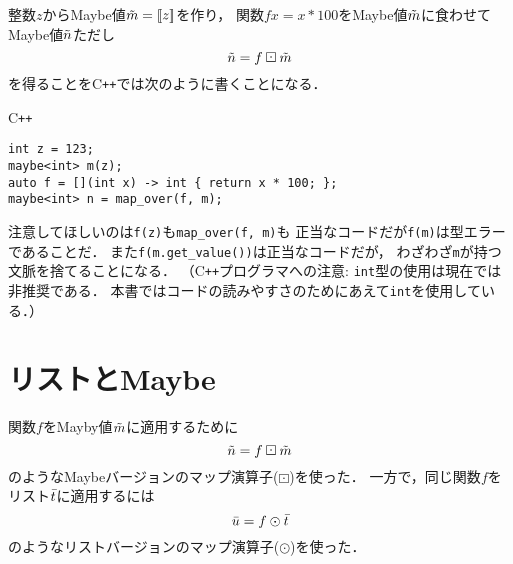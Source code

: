 \documentclass[a5paper,draft]{jsbook}
\def\[{\left[\!\left[}
\def\]{\right]\!\right]}
\newcommand{\programminglanguage}[1]{\textsf{#1}}
\newcommand{\cxx}{\programminglanguage{C}\texttt{++}}
\newcommand{\code}[1]{\texttt{#1}}
\newenvironment{cxxcode}{\begin{itembox}[r]{\cxx}}{\end{itembox}}
\newcommand{\mathListVar}[1]{\Bar{#1}}
\newcommand{\mathMaybeVar}[1]{\Tilde{#1}}
\newcommand{\mathMaybeWith}[1]{\[#1\]}
\newcommand{\mathMap}{\mathbin{\odot}}
\newcommand{\mathMaybeMap}{\mathbin{\boxdot}}
\begin{document}
整数$z$からMaybe値$\mathMaybeVar{m}=\mathMaybeWith{z}$を作り，
関数$fx=x*100$をMaybe値$\mathMaybeVar{m}$に食わせて
Maybe値$\mathMaybeVar{n}$ただし
$$
\mathMaybeVar{n}=f\mathMaybeMap\mathMaybeVar{m}
$$
を得ることを\cxx では次のように書くことになる．
\begin{cxxcode}
\begin{verbatim}
int z = 123;
maybe<int> m(z);
auto f = [](int x) -> int { return x * 100; };
maybe<int> n = map_over(f, m);
\end{verbatim}
\end{cxxcode}
注意してほしいのは\code{f(z)}も\code{map\_over(f, m)}も
正当なコードだが\code{f(m)}は型エラーであることだ．
また\code{f(m.get\_value())}は正当なコードだが，
わざわざ\code{m}が持つ文脈を捨てることになる．
（\cxx プログラマへの注意: \code{int}型の使用は現在では非推奨である．
本書ではコードの読みやすさのためにあえて\code{int}を使用している．）


\section{リストとMaybe}

関数$f$をMayby値$\mathMaybeVar{m}$に適用するために
$$
\mathMaybeVar{n}=f\mathMaybeMap\mathMaybeVar{m}
$$
のようなMaybeバージョンのマップ演算子($\mathMaybeMap$)を使った．
一方で，同じ関数$f$をリスト$\mathListVar{t}$に適用するには
$$
\mathListVar{u}=f\mathMap\mathListVar{t}
$$
のようなリストバージョンのマップ演算子($\mathMap$)を使った．
\end{document}
